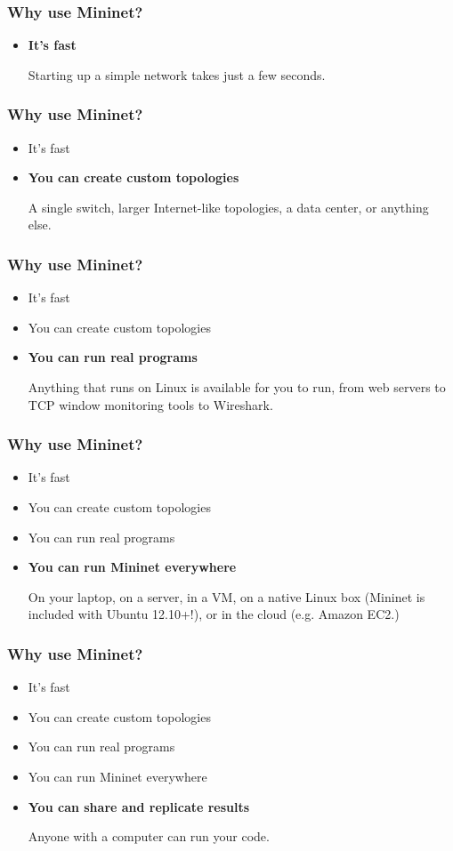 \documentclass{beamer}
\begin{document}
\begin{frame}
  \frametitle{Why use Mininet?}
  \begin{itemize}
    \item[\ding{219}] \textbf{It's fast}
      
      Starting up a simple network takes just a few seconds.
  \end{itemize}
\end{frame}
\begin{frame}
  \frametitle{Why use Mininet?}
  \begin{itemize}
    \item[\ding{219}] It's fast
    \item[\ding{219}] \textbf{You can create custom topologies}

      A single switch, larger Internet-like topologies, a data center,
      or anything else.
  \end{itemize}
\end{frame}
\begin{frame}
  \frametitle{Why use Mininet?}
  \begin{itemize}
    \item[\ding{219}] It's fast
    \item[\ding{219}] You can create custom topologies
    \item[\ding{219}] \textbf{You can run real programs}

      Anything that runs on Linux is available for you to run, from
      web servers to TCP window monitoring tools to Wireshark.
  \end{itemize}
\end{frame}
\begin{frame}
  \frametitle{Why use Mininet?}
  \begin{itemize}
    \item[\ding{219}] It's fast
    \item[\ding{219}] You can create custom topologies
    \item[\ding{219}] You can run real programs
    \item[\ding{219}] \textbf{You can run Mininet everywhere}

      On your laptop, on a server, in a VM, on a native Linux box
      (Mininet is included with Ubuntu 12.10+!), or in the cloud (e.g.
      Amazon EC2.)
  \end{itemize}
\end{frame}
\begin{frame}
  \frametitle{Why use Mininet?}
  \begin{itemize}
    \item[\ding{219}] It's fast
    \item[\ding{219}] You can create custom topologies
    \item[\ding{219}] You can run real programs
    \item[\ding{219}] You can run Mininet everywhere
    \item[\ding{219}] \textbf{You can share and replicate results}

      Anyone with a computer can run your code.
  \end{itemize}
\end{frame}
\end{document}
